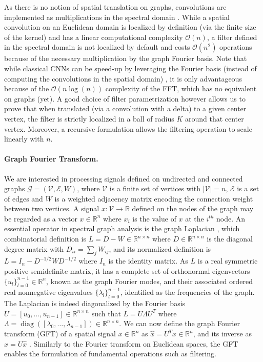\documentclass{article}
\DeclareMathOperator*{\diag}{diag}
\newcommand{\G}{\mathcal{G}}
\newcommand{\V}{\mathcal{V}}
\newcommand{\E}{\mathcal{E}}
\newcommand{\bO}{\mathcal{O}}
\newcommand{\R}{\mathbb{R}}
\begin{document}
As there is no notion of spatial translation on graphs, convolutions are
implemented as multiplications in the spectral domain
\cite{art:ShumanNarangFrossardOrtegaVandergheynst13ReviewSPG}. While a spatial
convolution on an Euclidean domain is localized by definition (via the finite
size of the kernel) and has a linear computational complexity $\bO(n)$, a filter
defined in the spectral domain is not localized by default and costs $\bO(n^2)$
operations because of the necessary multiplication by the graph Fourier basis.
Note that while classical CNNs can be speed-up by leveraging the Fourier basis
(instead of computing the convolutions in the spatial domain)
\cite{mathieu_fast_2013}, it is only advantageous because of the $\bO(n \log(n))$
complexity of the FFT, which has no equivalent on graphs (yet). A good choice of
filter parametrization however allows us to prove that when translated (via a
convolution with a delta) to a given center vertex, the filter is strictly
localized in a ball of radius $K$ around that center vertex. Moreover, a
recursive formulation allows the filtering operation to scale linearly with $n$.

\paragraph{Graph Fourier Transform.} We are interested in processing signals
defined on undirected and connected graphs $\G=(\V,\E,W)$, where $\V$ is a
finite set of vertices with $|\V|=n$, $\E$ is a set of edges and $W$ is a
weighted adjacency matrix encoding the connection weight between two vertices. A
signal $x: \V \rightarrow \R$ defined on the nodes of the graph may be regarded
as a vector $x \in \R^n$ where $x_i$ is the value of $x$ at the $i^{th}$ node.
An essential operator in spectral graph analysis is the graph Laplacian
\cite{book:Chung97Spectral}, which combinatorial definition is $L = D - W \in
\R^{n \times n}$ where $D \in \R^{n \times n}$ is the diagonal degree matrix
with $D_{ii} = \sum_j W_{ij}$, and its normalized definition is $L = I_n -
D^{-1/2} W D^{-1/2}$ where $I_n$ is the identity matrix. As $L$ is a real
symmetric positive semidefinite matrix, it has a complete set of orthonormal
eigenvectors $\{u_l\}_{l=0}^{n-1} \in \R^n$, known as the graph Fourier modes,
and their associated ordered real nonnegative eigenvalues
$\{\lambda_l\}_{l=0}^{n-1}$, identified as the frequencies of the graph. The
Laplacian is indeed diagonalized by the Fourier basis $U=[u_0, \ldots, u_{n-1}]
\in \R^{n \times n}$ such that $L = U \Lambda U^T$ where $\Lambda =
\diag([\lambda_0, \ldots, \lambda_{n-1}]) \in \R^{n \times n}$. We can now
define the graph Fourier transform (GFT) of a spatial signal $x \in \R^n$ as
$\hat{x} = U^T x \in \R^n$, and its inverse as $x = U \hat{x}$
\cite{art:ShumanNarangFrossardOrtegaVandergheynst13ReviewSPG}. Similarly to the
Fourier transform on Euclidean spaces, the GFT enables the formulation of
fundamental operations such as filtering.
\end{document}
